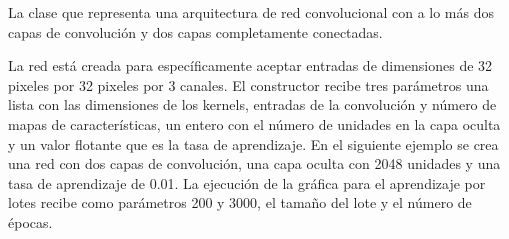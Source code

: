 \begin{fulllineitems}
\label{\detokenize{model_desc:cnn_indoor_classifier_model.CNNClassifierLAR}}
La clase que representa una arquitectura de red convolucional con a lo más
dos capas de convolución y dos capas completamente conectadas.

La red está creada para específicamente aceptar entradas de dimensiones
de 32 pixeles por 32 pixeles por 3 canales. El constructor recibe tres parámetros
una lista con las dimensiones de los kernels, entradas de la convolución y
número de mapas de características, un entero con el número de unidades en la
capa oculta y un valor flotante que es la tasa de aprendizaje.
En el siguiente ejemplo se crea una red con dos capas de convolución,
una capa oculta con 2048 unidades y una tasa de aprendizaje de 0.01. La ejecución de la gráfica
para el aprendizaje por lotes recibe como parámetros 200 y 3000,
el tamaño del lote y el número de épocas.

%
\begin{sphinxVerbatim}[commandchars=\\\{\}]
   
  \PYG{p}{[}\PYG{p}{[}   \PYG{p}{]} \PYG{p}{[}   \PYG{p}{]}\PYG{p}{]}  
 
\end{sphinxVerbatim}


\end{fulllineitems}
